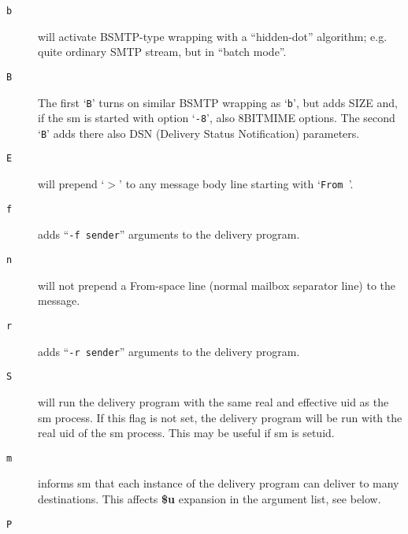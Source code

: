 \begin{description}
\item[ {\tt b}] \mbox{}

will activate BSMTP-type wrapping with a ``hidden-dot''
algorithm; e.g. quite ordinary SMTP stream, but in ``batch mode''.



\item[ {\tt B}] \mbox{}

The  first `{\tt B}'  turns on similar BSMTP wrapping as
`{\tt b}', but adds SIZE and, if the sm is  started  with
option `{\tt -8}', also 8BITMIME options.  The second `{\tt B}'
adds there also DSN (Delivery Status  Notification) parameters.



\item[ {\tt E}] \mbox{}

will prepend `{\(>\)}' to any message body line starting
with `{\tt From }'.



\item[ {\tt f}] \mbox{}

adds ``{\tt -f sender}'' arguments to the delivery program.



\item[ {\tt n}] \mbox{}

will not prepend a From-space line (normal mailbox
separator line) to the message.



\item[ {\tt r}] \mbox{}

adds ``{\tt -r sender}'' arguments to the delivery program.



\item[ {\tt S}] \mbox{}

will run the delivery program with the same real
and effective uid as the sm process.  If this  flag
is  not  set, the delivery program will be run with
the real uid of the sm process. This may be useful if sm is setuid.



\item[ {\tt m}] \mbox{}

informs sm that each instance of the delivery program  
can deliver to many destinations. This affects {\bf \$u} expansion 
in the argument list, see below.



\item[ {\tt P}] \mbox{}


\end{description}
